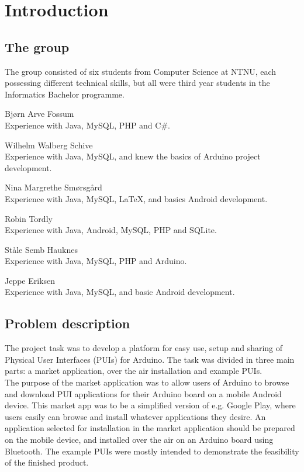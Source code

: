 \chapter{Introduction}
\section{The group}
The group consisted of six students from Computer Science at NTNU, each possessing different technical skills, but all were third year students in the Informatics Bachelor programme.

\begin{description}
\item{Bjørn Arve Fossum}\hfill \\
	Experience with Java, MySQL, PHP and C\#.
\item{Wilhelm Walberg Schive}\hfill \\
	Experience with Java, MySQL, and knew the basics of Arduino project development.
\item{Nina Margrethe Smørsgård}\hfill \\
	Experience with Java, MySQL, \LaTeX, and basics Android development.
\item{Robin Tordly}\hfill \\
	Experience with Java, Android, MySQL, PHP and SQLite. 
\item{Ståle Semb Hauknes}\hfill \\
	Experience with Java, MySQL, PHP and Arduino.
\item{Jeppe Eriksen}\hfill \\
	Experience with Java, MySQL, and basic Android development. 
\end{description}

\section{Problem description}
The project task was to develop a platform for easy use, setup and sharing of Physical User Interfaces (PUIs) for Arduino. The task was divided in three main parts: a market application, over the air installation and example PUIs.\\
\newline
The purpose of the market application was to allow users of Arduino to browse and download PUI applications for their Arduino board on a mobile Android device. This market app was to be a simplified version of e.g. Google Play, where users easily can browse and install whatever applications they desire. An application selected for installation in the market application should be prepared on the mobile device, and installed over the air on an Arduino board using Bluetooth. The example PUIs were mostly intended to demonstrate the feasibility of the finished product.

